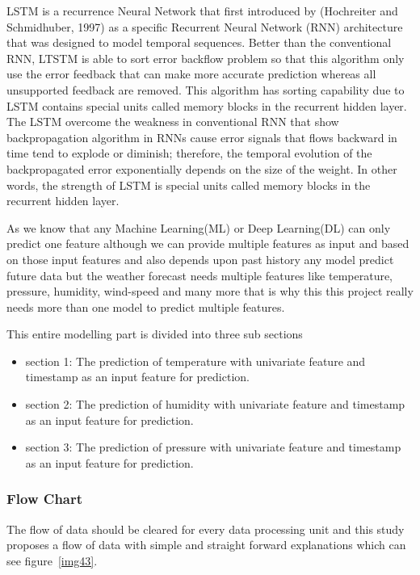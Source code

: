 LSTM is a recurrence Neural Network that first
introduced by (Hochreiter and Schmidhuber, 1997) as a
specific Recurrent Neural Network (RNN) architecture that was designed to model temporal sequences. Better
than the conventional RNN, LTSTM is able to sort error
backflow problem so that this algorithm only use the
error feedback that can make more accurate prediction
whereas all unsupported feedback are removed. This
algorithm has sorting capability due to LSTM contains
special units called memory blocks in the recurrent
hidden layer. The LSTM overcome the weakness in
conventional RNN that show backpropagation algorithm
in RNNs cause error signals that flows backward in time
tend to explode or diminish; therefore, the temporal
evolution of the backpropagated error exponentially
depends on the size of the weight. In other words, the
strength of LSTM is special units called memory blocks
in the recurrent hidden layer. 

As we know that any Machine Learning(ML) or Deep Learning(DL) can only predict one feature although we can provide multiple features as input and based on those input features and also depends upon past history any model predict future data but the weather forecast needs multiple features like temperature, pressure, humidity, wind-speed and many more that is why this this project really needs more than one model to predict multiple features.

This entire modelling part is divided into three sub sections

\begin{itemize}
\item section 1: The prediction of temperature with univariate feature and timestamp as an input feature for prediction.

\item section 2: The prediction of humidity with univariate feature and timestamp as an input feature for prediction.

\item section 3: The prediction of pressure with univariate feature and timestamp as an input feature for prediction.
\end{itemize}

\subsubsection{Flow Chart}
The flow of data should be cleared for every data processing unit and this study proposes a flow of data with simple and straight forward explanations which can see figure~\ref{img43}.

